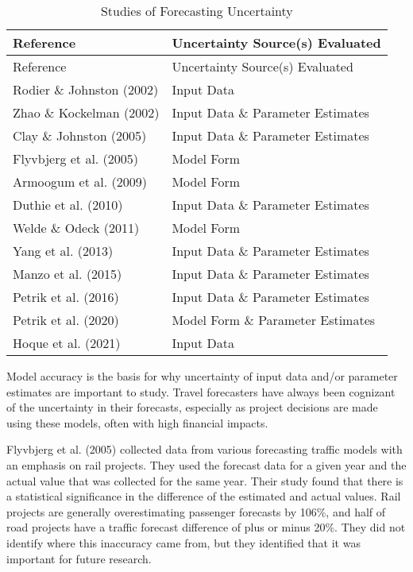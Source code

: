 \documentclass[
  letterpaper,
  authoryear,
  review,
  3p]{elsarticle}
\begin{document}
\hypertarget{tbl-authors}{}
\begin{longtable}[]{@{}ll@{}}
\caption{\label{tbl-authors}Studies of Forecasting
Uncertainty}\tabularnewline
\toprule\noalign{}
Reference & Uncertainty Source(s) Evaluated \\
\midrule\noalign{}
\endfirsthead
\toprule\noalign{}
Reference & Uncertainty Source(s) Evaluated \\
\midrule\noalign{}
\endhead
\bottomrule\noalign{}
\endlastfoot
Rodier \& Johnston (2002) & Input Data \\
Zhao \& Kockelman (2002) & Input Data \& Parameter Estimates \\
Clay \& Johnston (2005) & Input Data \& Parameter Estimates \\
Flyvbjerg et al. (2005) & Model Form \\
Armoogum et al. (2009) & Model Form \\
Duthie et al. (2010) & Input Data \& Parameter Estimates \\
Welde \& Odeck (2011) & Model Form \\
Yang et al. (2013) & Input Data \& Parameter Estimates \\
Manzo et al. (2015) & Input Data \& Parameter Estimates \\
Petrik et al. (2016) & Input Data \& Parameter Estimates \\
Petrik et al. (2020) & Model Form \& Parameter Estimates \\
Hoque et al. (2021) & Input Data \\
\end{longtable}

Model accuracy is the basis for why uncertainty of input data and/or
parameter estimates are important to study. Travel forecasters have
always been cognizant of the uncertainty in their forecasts, especially
as project decisions are made using these models, often with high
financial impacts.

Flyvbjerg et al. (2005) collected data from various forecasting traffic
models with an emphasis on rail projects. They used the forecast data
for a given year and the actual value that was collected for the same
year. Their study found that there is a statistical significance in the
difference of the estimated and actual values. Rail projects are
generally overestimating passenger forecasts by 106\%, and half of road
projects have a traffic forecast difference of plus or minus 20\%. They
did not identify where this inaccuracy came from, but they identified
that it was important for future research.
\end{document}
